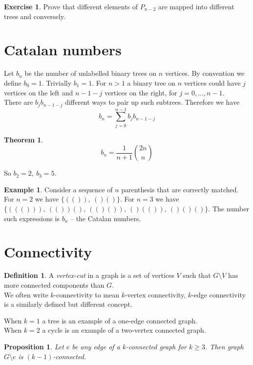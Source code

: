 \documentclass{article}
\newtheorem*{thm}{Theorem}
\newtheorem*{prop}{Proposition}
\theoremstyle{definition}
\newtheorem*{defn}{Definition}
\newtheorem*{ex}{Example}
\newtheorem*{exer}{Exercise}
\begin{document}
\begin{exer}
Prove that different elements of $P_{n-2}$ are mapped into different trees and conversely.
\end{exer}

\section{Catalan numbers}

Let $b_n$ be the number of unlabelled binary trees on $n$ vertices.
By convention we define $b_0 = 1$.
Trivially $b_1 = 1$.
For $n>1$ a binary tree on $n$ vertices could have $j$ vertices on the left and $n-1-j$ vertices on the right, for $j=0,\ldots,n-1$. \\
There are $b_jb_{n-1-j}$ different ways to pair up such subtrees.
Therefore we have
$$b_n =\sum_{j=0}^{n-1} b_jb_{n-1-j}$$

\begin{thm}
$$b_n = \frac{1}{n+1}\binom{2n}{n}$$
\end{thm}

So $b_2=2,\ b_3=5$.

\begin{ex}
Consider a sequence of $n$ parenthesis that are correctly matched.
For $n=2$ we have $\{(()),\ ()()\}$.
For $n=3$ we have $\{((())),\ (())(),\ (()()),\ ()(()),\ ()()()\}$.
The number such expressions is $b_n$ -- the Catalan numbers.
\end{ex}

\section{Connectivity}

\begin{defn}
A \emph{vertex-cut} in a graph is a set of vertices $V$ such that $G\setminus V$ has more connected components than $G$. \\
We often write $k$-connectivity to mean $k$-vertex connectivity, $k$-edge connectivity is a similarly defined but different concept.
\end{defn}

When $k=1$ a tree is an example of a one-edge connected graph.\\
When $k=2$ a cycle is an example of a two-vertex connected graph.

\begin{prop}
Let $e$ be any edge of a $k$-connected graph for $k\ge 3$.
Then graph $G\setminus e$ is $(k-1)$-connected.
\end{prop}
\end{document}
